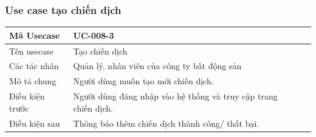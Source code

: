 \documentclass[12pt,a4paper]{article}
\begin{document}
    \subsubsection*{Use case tạo chiến dịch}
    \begin{table}[H]
        \centering
        \begin{tabular}{|p{3.5cm}|p{11.5cm}|c|}
            \hline
            Mã Usecase      & UC-008-3                                                        \\
            \hline
            Tên usecase     & Tạo chiến dịch                                                  \\
            \hline
            Các tác nhân    & Quản lý, nhân viên của công ty bất động sản                     \\
            \hline
            Mô tả chung     & Người dùng muốn tạo mới chiến dịch.                             \\
            \hline

            Điều kiện trước & Người dùng đăng nhập vào hệ thống và truy cập trang chiến dịch. \\
            \hline

            Điều kiện sau   & Thông báo thêm chiến dịch thành công/ thất bại.                 \\
            \hline


\end{tabular}
\end{table}
\end{document}
